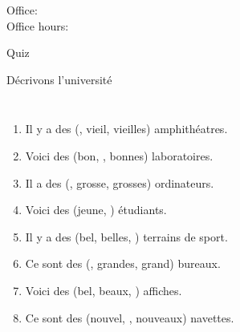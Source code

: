 \documentclass{beamer}
\subtitle[Adjectifs prénominaux au pluriel]{Les adjectifs prénominaux au pluriel}
\begin{document}
  \begin{frame}
    \titlepage
    \tiny{Office: \\
          Office hours: }
  \end{frame}

  \begin{frame}{}
    \begin{center}
      \Large Quiz
    \end{center}
  \end{frame}

  \begin{frame}{Décrivons l'université}
    \begin{columns}
        {\scriptsize
        \begin{enumerate}
          \item Il y a des (, vieil, vieilles) amphithéatres.
          \item Voici des (bon, , bonnes) laboratoires.
          \item Il a des (, grosse, grosses) ordinateurs.
          \item Voici des (jeune, ) étudiants.
          \item Il y a des (bel, belles, ) terrains de sport.
          \item Ce sont des (, grandes, grand) bureaux.
          \item Voici des (bel, beaux, ) affiches.
          \item Ce sont des (nouvel, , nouveaux) navettes.
        \end{enumerate}
        }
        \begin{minipage}[c][0.6\textheight]{\linewidth}
          \begin{center}
          \end{center}
        \end{minipage}
    \end{columns}
  \end{frame}
\end{document}
